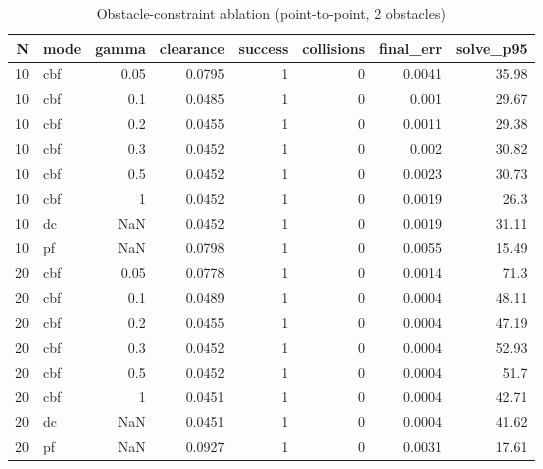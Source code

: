 \begin{table}
\caption{Obstacle-constraint ablation (point-to-point, 2 obstacles)}
\label{tab:ablation_gamma}
\begin{tabular}{rlrrrrrr}
\toprule
N & mode & gamma & clearance & success & collisions & final\_err & solve\_p95 \\
\midrule
10 & cbf & 0.05 & 0.0795 & 1 & 0 & 0.0041 & 35.98 \\
10 & cbf & 0.1 & 0.0485 & 1 & 0 & 0.001 & 29.67 \\
10 & cbf & 0.2 & 0.0455 & 1 & 0 & 0.0011 & 29.38 \\
10 & cbf & 0.3 & 0.0452 & 1 & 0 & 0.002 & 30.82 \\
10 & cbf & 0.5 & 0.0452 & 1 & 0 & 0.0023 & 30.73 \\
10 & cbf & 1 & 0.0452 & 1 & 0 & 0.0019 & 26.3 \\
10 & dc & NaN & 0.0452 & 1 & 0 & 0.0019 & 31.11 \\
10 & pf & NaN & 0.0798 & 1 & 0 & 0.0055 & 15.49 \\
20 & cbf & 0.05 & 0.0778 & 1 & 0 & 0.0014 & 71.3 \\
20 & cbf & 0.1 & 0.0489 & 1 & 0 & 0.0004 & 48.11 \\
20 & cbf & 0.2 & 0.0455 & 1 & 0 & 0.0004 & 47.19 \\
20 & cbf & 0.3 & 0.0452 & 1 & 0 & 0.0004 & 52.93 \\
20 & cbf & 0.5 & 0.0452 & 1 & 0 & 0.0004 & 51.7 \\
20 & cbf & 1 & 0.0451 & 1 & 0 & 0.0004 & 42.71 \\
20 & dc & NaN & 0.0451 & 1 & 0 & 0.0004 & 41.62 \\
20 & pf & NaN & 0.0927 & 1 & 0 & 0.0031 & 17.61 \\
\bottomrule
\end{tabular}
\end{table}
